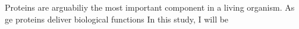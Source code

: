 Proteins are arguabiliy the most important component in a living organism. As ge proteins deliver biological functions   In this study, I will be 